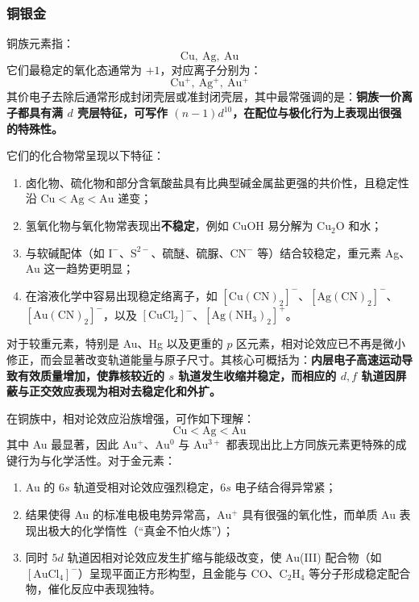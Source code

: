 \documentclass[UTF8]{ctexbook}
\begin{document}
\subsubsection{铜银金}

铜族元素指：
\[
\mathrm{Cu,\ Ag,\ Au}
\]
它们最稳定的氧化态通常为 $+1$，对应离子分别为：
\[
\mathrm{Cu^+,\ Ag^+,\ Au^+}
\]
其价电子去除后通常形成封闭壳层或准封闭壳层，其中最常强调的是：\textbf{铜族一价离子都具有满 $d$ 壳层特征，可写作 $(n-1)d^{10}$，在配位与极化行为上表现出很强的特殊性。}

它们的化合物常呈现以下特征：
\begin{enumerate}
  \item 卤化物、硫化物和部分含氧酸盐具有比典型碱金属盐更强的共价性，且稳定性沿 $\mathrm{Cu<Ag<Au}$ 递变；
  \item 氢氧化物与氧化物常表现出\textbf{不稳定}，例如 $\mathrm{CuOH}$ 易分解为 $\mathrm{Cu_2O}$ 和水；
  \item 与软碱配体（如 $\mathrm{I^-}$、$\mathrm{S^{2-}}$、硫醚、硫脲、$\mathrm{CN^-}$ 等）结合较稳定，重元素 Ag、Au 这一趋势更明显；
  \item 在溶液化学中容易出现稳定络离子，如 $\mathrm{[Cu(CN)_2]^-}$、$\mathrm{[Ag(CN)_2]^-}$、$\mathrm{[Au(CN)_2]^-}$，以及 $\mathrm{[CuCl_2]^-}$、$\mathrm{[Ag(NH_3)_2]^+}$。
\end{enumerate}

对于较重元素，特别是 Au、Hg 以及更重的 $p$ 区元素，相对论效应已不再是微小修正，而会显著改变轨道能量与原子尺寸。其核心可概括为：\textbf{内层电子高速运动导致有效质量增加，使靠核较近的 $s$ 轨道发生收缩并稳定，而相应的 $d,f$ 轨道因屏蔽与正交效应表现为相对去稳定化和外扩。}

在铜族中，相对论效应沿族增强，可作如下理解：
\[
\mathrm{Cu < Ag < Au}
\]
其中 Au 最显著，因此 $\mathrm{Au^+}$、$\mathrm{Au^0}$ 与 $\mathrm{Au^{3+}}$ 都表现出比上方同族元素更特殊的成键行为与化学活性。对于金元素：
\begin{enumerate}
  \item Au 的 $6s$ 轨道受相对论效应强烈稳定，$6s$ 电子结合得异常紧；
  \item 结果使得 Au 的标准电极电势异常高，$\mathrm{Au^+}$ 具有很强的氧化性，而单质 Au 表现出极大的化学惰性（“真金不怕火炼”）；
  \item 同时 $5d$ 轨道因相对论效应发生扩缩与能级改变，使 Au(III) 配合物（如 $\mathrm{[AuCl_4]^-}$）呈现平面正方形构型，且金能与 $\mathrm{CO}$、$\mathrm{C_2H_4}$ 等分子形成稳定配合物，催化反应中表现独特。
\end{enumerate}
\end{document}
